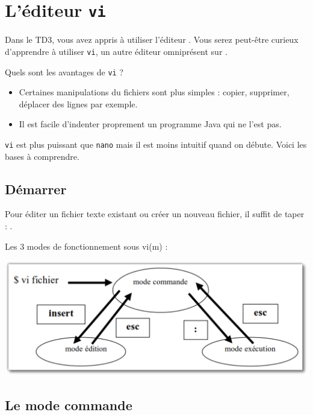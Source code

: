 \documentclass[a4paper,11pt]{style-esi/td}
\begin{document}
\libelledocument{\unitnb{} -- \unitname}
\entete
\titre
{}
\lastedit

\bigskip

\section{L'éditeur \texttt{vi}}

Dans le TD3, vous avez appris à utiliser l'éditeur .
Vous serez peut-être curieux d'apprendre à utiliser \texttt{vi},
un autre éditeur omniprésent sur .

Quels sont les avantages de \texttt{vi} ?
\begin{itemize}
	\item
	      Certaines manipulations du fichiers sont plus simples :
	      copier, supprimer, déplacer des lignes par exemple.
	\item
	      Il est facile d'indenter proprement un programme Java qui ne l'est pas.
\end{itemize}

\texttt{vi} est plus puissant que \texttt{nano}
mais il est moins intuitif quand on débute.
Voici les bases à comprendre.

\subsection*{Démarrer}

Pour éditer un fichier texte existant
ou créer un nouveau fichier,
il suffit de taper : .

Les 3 modes de fonctionnement sous vi(m) :
\begin{center}
	\includegraphics[width=.7\textwidth]{image/vi.pdf}
\end{center}

\subsection*{Le mode commande}
\end{document}
